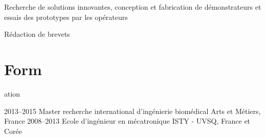 \documentclass{cv-style}     %
\begin{document}
\begin{entrylist}
{ Recherche de solutions innovantes, conception et fabrication de démonstrateurs et essais des prototypes par les opérateurs

 Rédaction de brevets
 }



\end{entrylist}


\section{Form}{ation}

\begin{entrylist}
\entry
    {2013--2015     }
    {Master recherche international d'ingénierie biomédical}%
    {Arts et Métiers, France}
    {}
\entry
 {2008--2013     }
    {Ecole d'ingénieur en mécatronique} %
    {ISTY - UVSQ, France et Corée}
    {}
\end{entrylist}
\end{document}
